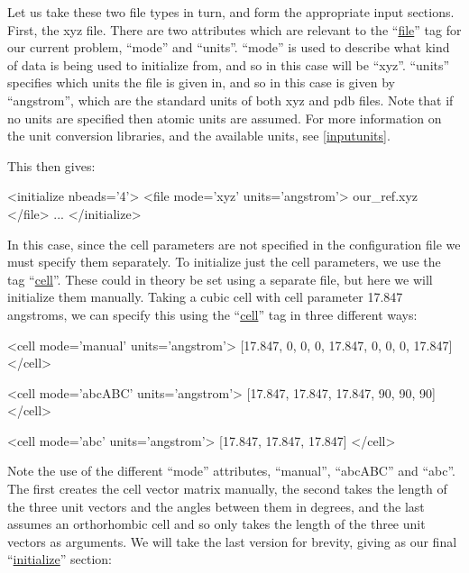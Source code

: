 \documentclass[11pt,english,fleqn]{report}
\newenvironment{code}{%
\footnotesize 
\verbatim
}{
\endverbatim
\normalsize
}
\begin{document}
Let us take these two file types in turn, and form the appropriate
input sections. First, the xyz file. 
There are two attributes which are 
relevant to the {}``\hyperref[INITFILE]{file}'' tag
for our current problem, {}``mode'' and {}``units''.
{}``mode'' is used to describe what kind of data is being used to
initialize from, and so in this case will be {}``xyz''.
{}``units'' specifies which units the file is given in, and
so in this case is given by {}``angstrom'', which are the
standard units of both xyz and pdb files. 
Note that if no units are specified then atomic units are assumed.
For more information on the \ipi unit conversion libraries, 
and the available units, see \ref{inputunits}.

This then gives:

\begin{code}
<initialize nbeads='4'>
   <file mode='xyz' units='angstrom'> our_ref.xyz </file>
   ...
</initialize>
\end{code}

In this case, since the cell parameters are not specified in the
configuration file we must specify them separately. 
To initialize just the cell parameters, 
we use the tag {}``\hyperref[INITCELL]{cell}''.
These could in theory be set using a separate
file, but here we will initialize them manually. Taking a cubic cell
with cell parameter 17.847 angstroms, we can specify this using
the {}``\hyperref[INITCELL]{cell}'' tag in three different ways:

\begin{code}
<cell mode='manual' units='angstrom'> 
   [17.847, 0, 0, 0, 17.847, 0, 0, 0, 17.847] 
</cell>
\end{code}

\begin{code}
<cell mode='abcABC' units='angstrom'>
   [17.847, 17.847, 17.847, 90, 90, 90]
</cell>
\end{code}

\begin{code}
<cell mode='abc' units='angstrom'>
   [17.847, 17.847, 17.847]
</cell>
\end{code}

Note the use of the different {}``mode'' attributes, {}``manual'',
{}``abcABC'' and {}``abc''. The first creates the cell vector
matrix manually, the second takes the length of the three unit vectors
and the angles between them in degrees, and the last assumes an orthorhombic
cell and so only takes the length of the three unit vectors as arguments.
We will take the last version for brevity, giving as our final 
{}``\hyperref[INITIALIZER]{initialize}'' section:
\end{document}
